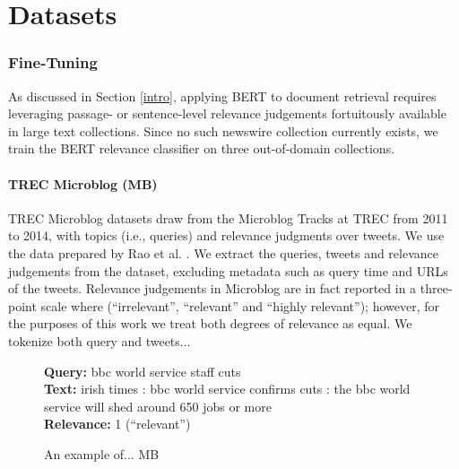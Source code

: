 \chapter{Datasets}






\subsection{Fine-Tuning}

As discussed in Section \ref{intro}, applying BERT to document retrieval requires leveraging passage- or sentence-level relevance judgements fortuitously available in large text collections.
Since no such newswire collection currently exists, we train the BERT relevance classifier on three out-of-domain collections.

\subsubsection{TREC Microblog (MB)}

TREC Microblog datasets draw from the Microblog Tracks at TREC from 2011 to 2014, with topics (i.e., queries) and relevance judgments over tweets.
We use the data prepared by Rao et al. \cite{rao2019tweet}.
We extract the queries, tweets and relevance judgements from the dataset, excluding metadata such as query time and URLs of the tweets.
Relevance judgements in Microblog are in fact reported in a three-point scale where (``irrelevant'', ``relevant'' and ``highly relevant''); however, for the purposes of this work we treat both degrees of relevance as equal.
We tokenize both query and tweets...

\begin{figure}[b!]
	\begin{framed}
		\centering
    		\textbf{Query:} bbc world service staff cuts \\
    		\textbf{Text:} irish times : bbc world service confirms cuts : the bbc world service will shed around 650 jobs or more \\
    		\textbf{Relevance:} 1 (``relevant'')
	\end{framed}
\label{mb-example}
 \caption{An example of... MB}
\end{figure}

